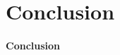 \documentclass[12pt]{article}
\numberwithin{equation}{section}
\begin{document}
\section{Conclusion}
	
	\paragraph{Conclusion}
	
\newpage

\nocite{*}
\printbibliography

\newpage

	
\end{document}
